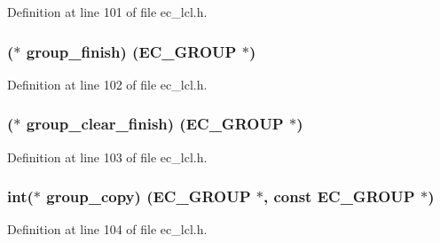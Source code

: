 Definition at line 101 of file ec\+\_\+lcl.\+h.

\subsubsection[{\texorpdfstring{group\+\_\+finish}{group_finish}}]{($\ast$ group\+\_\+finish) ({\bf E\+C\+\_\+\+G\+R\+O\+UP} $\ast$)}\hypertarget{structec__method__st_a11e6826f1cca4d2e125c48c3c961fdab}{}\label{structec__method__st_a11e6826f1cca4d2e125c48c3c961fdab}


Definition at line 102 of file ec\+\_\+lcl.\+h.

\subsubsection[{\texorpdfstring{group\+\_\+clear\+\_\+finish}{group_clear_finish}}]{($\ast$ group\+\_\+clear\+\_\+finish) ({\bf E\+C\+\_\+\+G\+R\+O\+UP} $\ast$)}\hypertarget{structec__method__st_a2e94b107ad47227ce8c663fa2ec0da02}{}\label{structec__method__st_a2e94b107ad47227ce8c663fa2ec0da02}


Definition at line 103 of file ec\+\_\+lcl.\+h.

\subsubsection[{\texorpdfstring{group\+\_\+copy}{group_copy}}]{\setlength{\rightskip}{0pt plus 5cm}int($\ast$ group\+\_\+copy) ({\bf E\+C\+\_\+\+G\+R\+O\+UP} $\ast$, const {\bf E\+C\+\_\+\+G\+R\+O\+UP} $\ast$)}\hypertarget{structec__method__st_af268d3033c6aa6a1349ca493e1aeec86}{}\label{structec__method__st_af268d3033c6aa6a1349ca493e1aeec86}


Definition at line 104 of file ec\+\_\+lcl.\+h.

